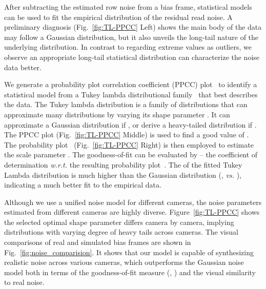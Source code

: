 \documentclass[10pt,twocolumn,letterpaper]{article}
\begin{document}
After subtracting the estimated row noise from a bias frame, 
statistical models can be used to fit the empirical distribution of the residual read noise. A preliminary diagnosis (Fig.~\ref{fig:TL-PPCC} Left) shows the main
body of the data may follow a Gaussian distribution, but it also
unveils the long-tail nature of the underlying distribution. 
In contrast to regarding extreme values as outliers, 
we observe an appropriate long-tail statistical distribution can
characterize the noise data better. 

We generate a probability plot correlation
coefficient (PPCC) plot~\cite{Filliben1975The} to identify a statistical model
from a Tukey lambda distributional family~\cite{Joiner1971Some} that best
describes the data. The Tukey lambda distribution is a family of distributions
that can approximate many distributions by varying its shape parameter
. It can 
approximate a Gaussian distribution if ,  or derive a
heavy-tailed distribution if .  
 The PPCC plot (Fig.~\ref{fig:TL-PPCC} Middle) is used to find a good value of . The
probability plot~\cite{Wilk1968Probability} (Fig.~\ref{fig:TL-PPCC} Right) is then employed to estimate the scale parameter . 
The goodness-of-fit can be evaluated by  -- the
coefficient of determination \emph{w.r.t.} the resulting probability plot~\cite{MORGAN201115}. 
The  of the fitted Tukey
Lambda distribution is much higher than the Gaussian distribution (\eg,  \emph{vs.}
), indicating a much better fit to the empirical data.

Although we use a unified noise model for different cameras,  
the noise parameters estimated from different cameras are highly diverse.  Figure~\ref{fig:TL-PPCC} shows the selected optimal shape parameter  differs camera by camera, implying distributions with varying degree of heavy tails across cameras.  The visual comparisons of real and simulated bias frames are shown in Fig.~\ref{fig:noise_comparision}. It shows that our model is capable of synthesizing realistic noise across various cameras, which outperforms the Gaussian noise model both in terms of the goodness-of-fit measure (\ie, ) and the visual similarity to real noise.
\end{document}
